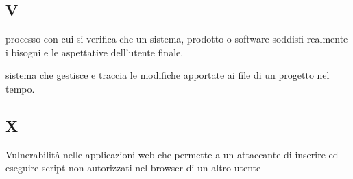 \subsection*{V}
\begin{description}[leftmargin=2cm, labelindent=1cm]
    \item[Validazione] processo con cui si verifica che un sistema, prodotto o software soddisfi realmente i bisogni e le aspettative dell'utente finale.
    \item[Version Control] sistema che gestisce e traccia le modifiche apportate ai file di un progetto nel tempo.
\end{description}

\subsection*{X}
\begin{description}[leftmargin=2cm, labelindent=1cm]
    \item[XSS] Vulnerabilità nelle applicazioni web che permette a un attaccante di inserire ed eseguire script non autorizzati nel browser di un altro utente
\end{description}